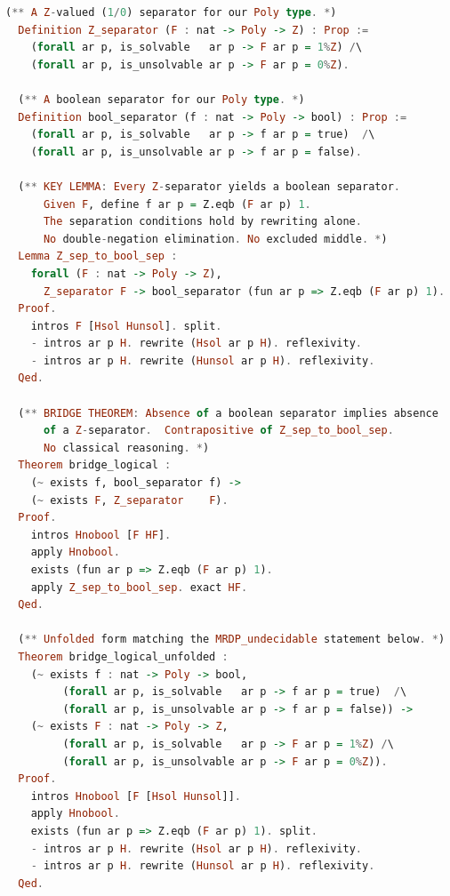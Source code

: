 \documentclass{lmcs}
\begin{document}
\begin{lstlisting}[language=Haskell, caption=Complete Rocq Formalization, label=lst:rocq, basicstyle=\ttfamily\tiny]
  (** A Z-valued (1/0) separator for our Poly type. *)
  Definition Z_separator (F : nat -> Poly -> Z) : Prop :=
    (forall ar p, is_solvable   ar p -> F ar p = 1%Z) /\
    (forall ar p, is_unsolvable ar p -> F ar p = 0%Z).

  (** A boolean separator for our Poly type. *)
  Definition bool_separator (f : nat -> Poly -> bool) : Prop :=
    (forall ar p, is_solvable   ar p -> f ar p = true)  /\
    (forall ar p, is_unsolvable ar p -> f ar p = false).

  (** KEY LEMMA: Every Z-separator yields a boolean separator.
      Given F, define f ar p = Z.eqb (F ar p) 1.
      The separation conditions hold by rewriting alone.
      No double-negation elimination. No excluded middle. *)
  Lemma Z_sep_to_bool_sep :
    forall (F : nat -> Poly -> Z),
      Z_separator F -> bool_separator (fun ar p => Z.eqb (F ar p) 1).
  Proof.
    intros F [Hsol Hunsol]. split.
    - intros ar p H. rewrite (Hsol ar p H). reflexivity.
    - intros ar p H. rewrite (Hunsol ar p H). reflexivity.
  Qed.

  (** BRIDGE THEOREM: Absence of a boolean separator implies absence
      of a Z-separator.  Contrapositive of Z_sep_to_bool_sep.
      No classical reasoning. *)
  Theorem bridge_logical :
    (~ exists f, bool_separator f) ->
    (~ exists F, Z_separator    F).
  Proof.
    intros Hnobool [F HF].
    apply Hnobool.
    exists (fun ar p => Z.eqb (F ar p) 1).
    apply Z_sep_to_bool_sep. exact HF.
  Qed.

  (** Unfolded form matching the MRDP_undecidable statement below. *)
  Theorem bridge_logical_unfolded :
    (~ exists f : nat -> Poly -> bool,
         (forall ar p, is_solvable   ar p -> f ar p = true)  /\
         (forall ar p, is_unsolvable ar p -> f ar p = false)) ->
    (~ exists F : nat -> Poly -> Z,
         (forall ar p, is_solvable   ar p -> F ar p = 1%Z) /\
         (forall ar p, is_unsolvable ar p -> F ar p = 0%Z)).
  Proof.
    intros Hnobool [F [Hsol Hunsol]].
    apply Hnobool.
    exists (fun ar p => Z.eqb (F ar p) 1). split.
    - intros ar p H. rewrite (Hsol ar p H). reflexivity.
    - intros ar p H. rewrite (Hunsol ar p H). reflexivity.
  Qed.


\end{lstlisting}
\end{document}
